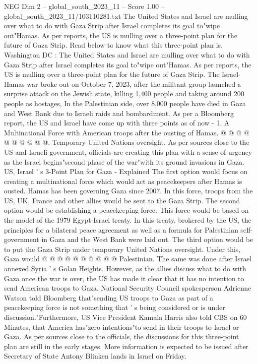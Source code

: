 \begin{textsample}{NEG Dim 2 – global\_south\_2023\_11 – Score 1.00 – global\_south\_2023\_11/103110281.txt}  \label{ex:f2_neg_349}
The United States and Israel are mulling over what to do with Gaza Strip after Israel completes its goal to"wipe out"Hamas.
As per reports, the US is mulling over a three-point plan for the future of Gaza Strip.
Read below to know what this three-point plan is.
Washington DC : The United States and Israel are mulling over what to do with Gaza Strip after Israel completes its goal to"wipe out"Hamas.
As per reports, the US is mulling over a three-point plan for the future of Gaza Strip.
The Israel-Hamas war broke out on October 7, 2023, after the militant group launched a surprise attack on the Jewish state, killing 1,400 people and taking around 200 people as hostages, In the Palestinian side, over 8,000 people have died in Gaza and West Bank due to Israeli raids and bombardment.
As per a Bloomberg report, the US and Israel have come up with three points as of now - 1.
A Multinational Force with American troops after the ousting of Hamas. @ @ @ @ @ @ @ @ @ @.
Temporary United Nations oversight.
As per sources close to the US and Israeli government, officials are creating this plan with a sense of urgency as the Israel begins"second phase of the war"with its ground invasions in Gaza.
US, Israel ' s 3-Point Plan for Gaza - Explained The first option would focus on creating a multinational force which would act as peacekeepers after Hamas is ousted.
Hamas has been governing Gaza since 2007.
In this force, troops from the US, UK, France and other allies would be sent to the Gaza Strip.
The second option would be establishing a peacekeeping force.
This force would be based on the model of the 1979 Egypt-Israel treaty.
In this treaty, brokered by the US, the principles for a bilateral peace agreement as well as a formula for Palestinian self-government in Gaza and the West Bank were laid out.
The third option would be to put the Gaza Strip under temporary United Nations oversight.
Under this, Gaza would @ @ @ @ @ @ @ @ @ @ Palestinian.
The same was done after Israel annexed Syria ' s Golan Heights.
However, as the allies discuss what to do with Gaza once the war is over, the US has made it clear that it has no intention to send American troops to Gaza.
National Security Council spokesperson Adrienne Watson told Bloomberg that"sending US troops to Gaza as part of a peacekeeping force is not something that ' s being considered or is under discussion."Furthermore, US Vice President Kamala Harris also told CBS on 60 Minutes, that America has"zero intentions"to send in their troops to Israel or Gaza.
As per sources close to the officials, the discussions for this three-point plan are still in the early stages.
More information is expected to be issued after Secretary of State Antony Blinken lands in Israel on Friday.

\end{textsample}
